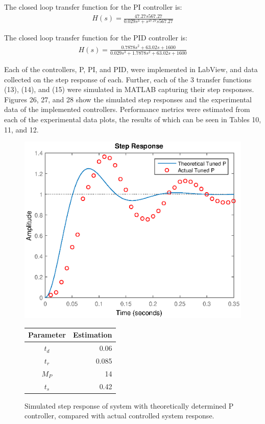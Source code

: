 \documentclass{article}
\begin{document}
The closed loop transfer function for the PI controller is:
\begin{align}
H(s) = \frac{47.27s 567.27}{0.029s^3 +s^ 47.27s 567.27}
\end{align}

The closed loop transfer function for the PID controller is:
\begin{align}
H(s) = \frac{0.7878s^2 + 63.02s + 1600}{0.029s^3 + 1.7878s^2 + 63.02s + 1600}
\end{align}

Each of the controllers, P, PI, and PID, were implemented in LabView, and data collected on the step response of each. Further, each of the 3 transfer functions (13), (14), and (15) were simulated in MATLAB capturing their step responses. Figures 26, 27, and 28 show the simulated step responses and the experimental data of the implemented controllers. Performance metrics were estimated from each of the experimental data plots, the results of which can be seen in Tables 10, 11, and 12. 

\begin{figure}[H]
	\hspace{0.5cm}
	\begin{minipage}{7cm}
		\centering
		\includegraphics[scale=0.5]{fig16}
		\caption{Simulated step response of system with theoretically determined P controller, compared with actual controlled system response.}
	\end{minipage}
	\hspace{1cm}
	\begin{minipage}{7cm}
		\begin{tabular}{cr}
			\toprule
			\textbf{Parameter} & \textbf{Estimation}\\
			\midrule
			$t_d$ & 0.06 \\
			$t_r$ & 0.085 \\
			$M_P$ & 14 \\
			$t_s$ & 0.42 \\
			\bottomrule
		\end{tabular}
	\end{minipage}
\end{figure}
\end{document}
